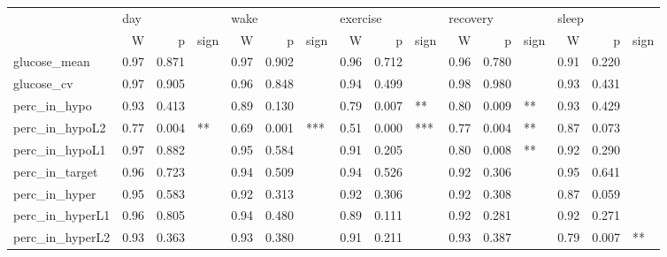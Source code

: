 \begin{tabular}{lrrlrrlrrlrrlrrl}
\toprule
{} & \multicolumn{3}{l}{day} & \multicolumn{3}{l}{wake} & \multicolumn{3}{l}{exercise} & \multicolumn{3}{l}{recovery} & \multicolumn{3}{l}{sleep} \\
{} &     W &      p & sign &     W &      p & sign &        W &      p & sign &        W &      p & sign &     W &      p & sign \\
\midrule
glucose_mean    &  0.97 &  0.871 &      &  0.97 &  0.902 &      &     0.96 &  0.712 &      &     0.96 &  0.780 &      &  0.91 &  0.220 &      \\
glucose_cv      &  0.97 &  0.905 &      &  0.96 &  0.848 &      &     0.94 &  0.499 &      &     0.98 &  0.980 &      &  0.93 &  0.431 &      \\
perc_in_hypo    &  0.93 &  0.413 &      &  0.89 &  0.130 &      &     0.79 &  0.007 &   ** &     0.80 &  0.009 &   ** &  0.93 &  0.429 &      \\
perc_in_hypoL2  &  0.77 &  0.004 &   ** &  0.69 &  0.001 &  *** &     0.51 &  0.000 &  *** &     0.77 &  0.004 &   ** &  0.87 &  0.073 &      \\
perc_in_hypoL1  &  0.97 &  0.882 &      &  0.95 &  0.584 &      &     0.91 &  0.205 &      &     0.80 &  0.008 &   ** &  0.92 &  0.290 &      \\
perc_in_target  &  0.96 &  0.723 &      &  0.94 &  0.509 &      &     0.94 &  0.526 &      &     0.92 &  0.306 &      &  0.95 &  0.641 &      \\
perc_in_hyper   &  0.95 &  0.583 &      &  0.92 &  0.313 &      &     0.92 &  0.306 &      &     0.92 &  0.308 &      &  0.87 &  0.059 &      \\
perc_in_hyperL1 &  0.96 &  0.805 &      &  0.94 &  0.480 &      &     0.89 &  0.111 &      &     0.92 &  0.281 &      &  0.92 &  0.271 &      \\
perc_in_hyperL2 &  0.93 &  0.363 &      &  0.93 &  0.380 &      &     0.91 &  0.211 &      &     0.93 &  0.387 &      &  0.79 &  0.007 &   ** \\
\bottomrule
\end{tabular}
